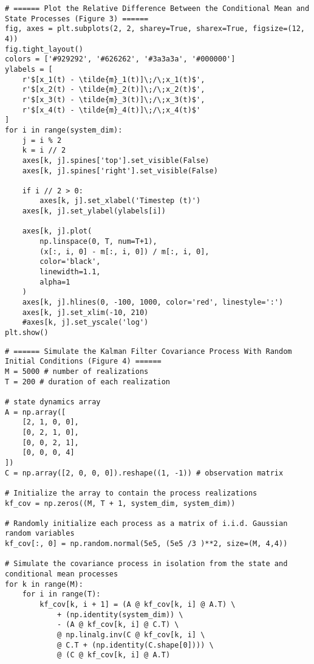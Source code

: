 \documentclass[10pt]{article}
\newcommand{\1}[1]{\mathbbm{1}_{#1}}
\begin{document}
    \begin{verbatim}
# ====== Plot the Relative Difference Between the Conditional Mean and State Processes (Figure 3) ======         
fig, axes = plt.subplots(2, 2, sharey=True, sharex=True, figsize=(12, 4))
fig.tight_layout()
colors = ['#929292', '#626262', '#3a3a3a', '#000000']
ylabels = [
    r'$[x_1(t) - \tilde{m}_1(t)]\;/\;x_1(t)$',
    r'$[x_2(t) - \tilde{m}_2(t)]\;/\;x_2(t)$',
    r'$[x_3(t) - \tilde{m}_3(t)]\;/\;x_3(t)$',
    r'$[x_4(t) - \tilde{m}_4(t)]\;/\;x_4(t)$'
]
for i in range(system_dim):
    j = i % 2
    k = i // 2
    axes[k, j].spines['top'].set_visible(False)
    axes[k, j].spines['right'].set_visible(False)

    if i // 2 > 0:
        axes[k, j].set_xlabel('Timestep (t)')
    axes[k, j].set_ylabel(ylabels[i])

    axes[k, j].plot(
        np.linspace(0, T, num=T+1),
        (x[:, i, 0] - m[:, i, 0]) / m[:, i, 0],
        color='black',
        linewidth=1.1,
        alpha=1
    )
    axes[k, j].hlines(0, -100, 1000, color='red', linestyle=':')
    axes[k, j].set_xlim(-10, 210)
    #axes[k, j].set_yscale('log')
plt.show()
    \end{verbatim}
    \begin{verbatim}
# ====== Simulate the Kalman Filter Covariance Process With Random Initial Conditions (Figure 4) ======
M = 5000 # number of realizations
T = 200 # duration of each realization

# state dynamics array
A = np.array([
    [2, 1, 0, 0],
    [0, 2, 1, 0],
    [0, 0, 2, 1],
    [0, 0, 0, 4]
])
C = np.array([2, 0, 0, 0]).reshape((1, -1)) # observation matrix

# Initialize the array to contain the process realizations
kf_cov = np.zeros((M, T + 1, system_dim, system_dim))

# Randomly initialize each process as a matrix of i.i.d. Gaussian random variables 
kf_cov[:, 0] = np.random.normal(5e5, (5e5 /3 )**2, size=(M, 4,4)) 

# Simulate the covariance process in isolation from the state and conditional mean processes
for k in range(M):
    for i in range(T):
        kf_cov[k, i + 1] = (A @ kf_cov[k, i] @ A.T) \
            + (np.identity(system_dim)) \
            - (A @ kf_cov[k, i] @ C.T) \
            @ np.linalg.inv(C @ kf_cov[k, i] \
            @ C.T + (np.identity(C.shape[0]))) \
            @ (C @ kf_cov[k, i] @ A.T)
    \end{verbatim}
\end{document}
